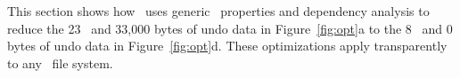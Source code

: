 This section shows how \Kudos\ uses generic \patch\
properties and dependency analysis to reduce the 23 \patches\ and 33,000 bytes
of undo data in Figure~\ref{fig:opt}a to the 8 \patches\ and 0 bytes of
undo data in Figure~\ref{fig:opt}d.
%
These optimizations apply transparently to any \Kudos\ file system.


\begin{comment}

Challenges in a \patch-based file system implementation include:

\textbf{Buffer cache graph traversal.}
%
In order to evict and write a block, the buffer cache must choose a block
$b$,
%
and then find a set of \patches\ $P_b \subseteq \PMem[b]$ whose dependencies
satisfy a graph property, namely that $\PDepset{P_b} \subseteq P_b \cup
\PDisk$.
%
It usually makes sense to define $P_b$ maximally---that is, as the
\emph{largest} corresponding set of \patches.
%
In the ideal (and common) case $P_b = \PMem[b]$, which lets the cache reuse
$b$'s memory once $P_b$ is committed to disk.  However, in some cases there
may be no block for which $P_b = \PMem[b]$.
%
It would also be nice if the blocks chosen for writing also maximized the
disk's commit rate, by minimizing seeks and so forth.

A naive implementation might calculate, for each in-memory block $b$, the
largest set of \patches\ $P_b \subseteq \PMem[b]$ with $\PDepset{P_b}
\subseteq P_b \cup \PDisk$, then evict some block close to previously
written blocks and with few reverted \patches\ (where $\PMem[b] - P_b$
is small).
%
This, however, would be extraordinarily expensive.
%
Finding $P_b$ requires traversing a dependency graph which might contain
thousands and thousands of nodes.
%
Doing so for each block, once per eviction, would take huge amounts of CPU
time.


\textbf{Undo memory usage.}
%
Only a small fraction of \patches\ will ever need to be reverted.
%
For example, most data writes never need to be reverted in any file
system.
%
If a \patch\ won't be reverted under any circumstances, the memory and
CPU time spent to preserve the old version is wasted.


\textbf{\Patch\ memory usage.}
%
\Patches\ themselves take up memory and require time to allocate, free, and
traverse.
%
If two \patches\ have redundant dependencies, it would be faster to combine
them.




The next section tackles all of these challenges.
\end{comment}


